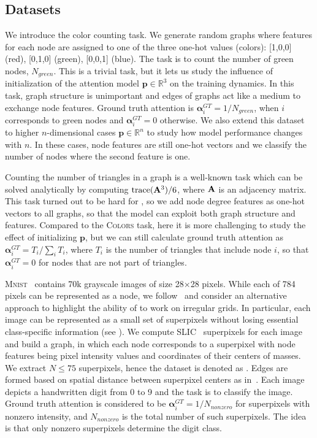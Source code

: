 \subsection{Datasets}
\label{sec:datasets}
 We introduce the color counting task. We generate random graphs where features for each node are assigned to one of the three one-hot values (colors): [1,0,0] (red), [0,1,0] (green), [0,0,1] (blue). The task is to count the number of green nodes, $N_{green}$. This is a trivial task, but it lets us study the influence of initialization of the attention model $\mathbf{p} \in \mathbb{R}^3$ on the training dynamics.
In this task, graph structure is unimportant and edges of graphs act like a medium to exchange node features. Ground truth attention is $\mathbf{\alpha}_i^{GT}=1 / N_{green}$, when $i$ corresponds to green nodes and $\mathbf{\alpha}_i^{GT}=0$ otherwise.
We also extend this dataset to higher $n$-dimensional cases $\mathbf{p} \in \mathbb{R}^n$ to study how model performance changes with $n$.
In these cases, node features are still one-hot vectors and we classify the number of nodes where the second feature is one.

 Counting the number of triangles in a graph is a well-known task which can be solved analytically by computing $\text{trace}(\mathbf{A}^3) / 6$, where $\mathbf{A}$ is an adjacency matrix. This task turned out to be hard for \gnns, so we add node degree features as one-hot vectors to all graphs, so that the model can exploit both graph structure and features. Compared to the \textsc{Colors} task, here it is more challenging to study the effect of initializing $\mathbf{p}$, but we can still calculate ground truth attention as $\mathbf{\alpha}_i^{GT}=T_i / \sum_i T_i$, where $T_i$ is the number of triangles that include node $i$, so that $\mathbf{\alpha}_i^{GT} = 0$ for nodes that are not part of triangles.

 \textsc{Mnist}~\citep{lecun1998gradient} contains 70k grayscale images of size 28$\times$28 pixels. While each of 784 pixels can be represented as a node, we follow~\citep{monti2017geometric, fey2018splinecnn} and consider an alternative approach to highlight the ability of \gnns to work on irregular grids. In particular, each image can be represented as a small set of superpixels without losing essential class-specific information (see \fig{\ref{fig:test_subsets}}). We compute SLIC~\citep{achanta2012slic} superpixels for each image and build a graph, in which each node corresponds to a superpixel with node features being pixel intensity values and coordinates of their centers of masses. We extract $N\leq75$ superpixels, hence the dataset is denoted as \mnist.
Edges are formed based on spatial distance between superpixel centers as in~\cite[Eq.~8]{defferrard2016convolutional}. Each image depicts a handwritten digit from 0 to 9 and the task is to classify the image. Ground truth attention is considered to be $\mathbf{\alpha}_i^{GT}=1 / N_{nonzero}$ for superpixels with nonzero intensity, and $N_{nonzero}$ is the total number of such superpixels. The idea is that only nonzero superpixels determine the digit class.

